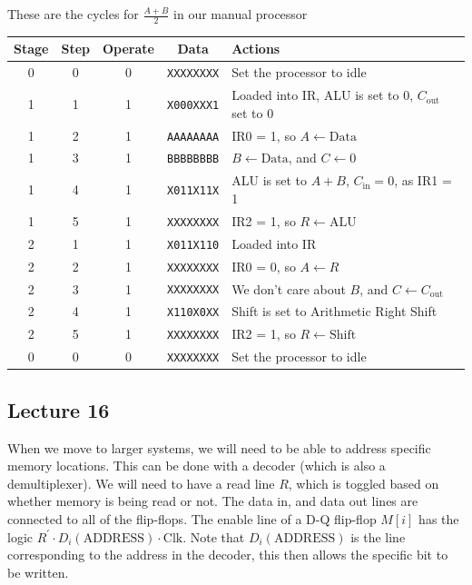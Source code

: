 \documentclass[a4paper, 12pt]{article}
\begin{document}
            These are the cycles for $\frac{A + B}{2}$ in our manual processor
            \begin{center}
                \begin{tabular}{c|c|c|c|l}
                    Stage & Step & Operate & Data & Actions \\
                    \hline
                    0 & 0 & 0 & \texttt{XXXXXXXX} & Set the processor to idle \\
                    \hline
                    1 & 1 & 1 & \texttt{X000XXX1} & Loaded into IR, ALU is set to 0, $C_\text{out}$ set to 0 \\
                    1 & 2 & 1 & \texttt{AAAAAAAA} & IR0 = 1, so $A \leftarrow \text{Data}$ \\
                    1 & 3 & 1 & \texttt{BBBBBBBB} & $B \leftarrow \text{Data}$, and $C \leftarrow 0$ \\
                    1 & 4 & 1 & \texttt{X011X11X} & ALU is set to $A+B$, $C_\text{in} = 0$, as IR1 = 1 \\
                    1 & 5 & 1 & \texttt{XXXXXXXX} & IR2 = 1, so $R \leftarrow \text{ALU}$ \\
                    \hline
                    2 & 1 & 1 & \texttt{X011X110} & Loaded into IR \\
                    2 & 2 & 1 & \texttt{XXXXXXXX} & IR0 = 0, so $A \leftarrow R$ \\
                    2 & 3 & 1 & \texttt{XXXXXXXX} & We don't care about $B$, and $C \leftarrow C_\text{out}$ \\
                    2 & 4 & 1 & \texttt{X110X0XX} & Shift is set to Arithmetic Right Shift \\
                    2 & 5 & 1 & \texttt{XXXXXXXX} & IR2 = 1, so $R \leftarrow \text{Shift}$ \\
                    \hline
                    0 & 0 & 0 & \texttt{XXXXXXXX} & Set the processor to idle
                \end{tabular}
            \end{center}
        \subsection*{Lecture 16}
            When we move to larger systems, we will need to be able to address specific memory locations. This can be done with a decoder (which is also a demultiplexer). We will need to have a read line $R$, which is toggled based on whether memory is being read or not. The data in, and data out lines are connected to all of the flip-flops. The enable line of a D-Q flip-flop $M[i]$ has the logic $R^\prime \cdot D_i(\text{ADDRESS}) \cdot \text{Clk}$. Note that $D_i(\text{ADDRESS})$ is the line corresponding to the address in the decoder, this then allows the specific bit to be written.
            \medskip
\end{document}
